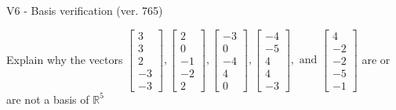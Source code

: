 \begin{exercise}
  \begin{exerciseTitle}V6 - Basis verification (ver. 765)\end{exerciseTitle}
  \begin{exerciseStatement}
    Explain why the vectors \(\left[\begin{array}{r}
3 \\
3 \\
2 \\
-3 \\
-3
\end{array}\right] , \left[\begin{array}{r}
2 \\
0 \\
-1 \\
-2 \\
2
\end{array}\right] , \left[\begin{array}{r}
-3 \\
0 \\
-4 \\
4 \\
0
\end{array}\right] , \left[\begin{array}{r}
-4 \\
-5 \\
4 \\
4 \\
-3
\end{array}\right] , \text{ and } \left[\begin{array}{r}
4 \\
-2 \\
-2 \\
-5 \\
-1
\end{array}\right]\) are or are not a basis of \(\mathbb{R}^5\)	



\end{exerciseStatement}
\end{exercise}
